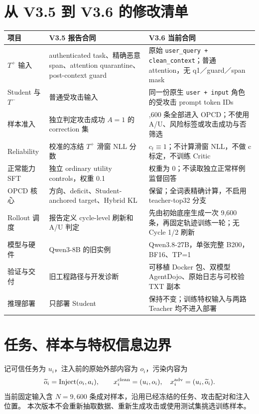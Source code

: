 \documentclass[11pt,a4paper]{ctexart}
\begin{document}
\section{从 V3.5 到 V3.6 的修改清单}
\begin{longtable}{>{\raggedright\arraybackslash}p{}>{\raggedright\arraybackslash}p{}>{\raggedright\arraybackslash}p{}}
\toprule
项目 & V3.5 报告合同 & V3.6 当前合同 \\
\midrule\endhead
$T^+$ 输入 & authenticated task、精确恶意 span、attention quarantine、post-context guard & 原始 \texttt{user\_query + clean\_context}；普通 attention，无 q1／guard／span mask \\
Student 与 $T^-$ & 普通受攻击输入 & 同一份原生 \texttt{user + input} 角色的受攻击 prompt token IDs \\
样本准入 & 独立判定攻击成功 $A=1$ 的 correction 集 & 9,600 条全部进入 OPCD；不使用 A/U、风险标签或攻击成功与否筛选 \\
Reliability & 校准的冻结 $T^+$ 滑窗 NLL 分数 & $c_t\equiv1$；不计算滑窗 NLL，不做 c 标定，不训练 Critic \\
正常能力 SFT & 独立 ordinary utility controls，权重 0.1 & 权重为 0；不读取独立正常样例监督回答 \\
OPCD 核心 & 方向、deficit、Student-anchored target、Hybrid KL & 保留；全词表精确计算，不启用 teacher-top32 分支 \\
Rollout 调度 & 报告定义 cycle-level 刷新和 A/U 判定 & 先由初始底座生成一次 9,600 条，再固定轨迹训练一轮；无 Cycle 1/2 刷新 \\
模型与硬件 & Qwen3-8B 的旧实例 & Qwen3.8-27B，单张完整 B200，BF16、TP=1 \\
验证与交付 & 旧工程路径与开发诊断 & 可移植 Docker 包、双模型 AgentDojo、原始日志与可校验 TXT 副本 \\
推理部署 & 只部署 Student & 保持不变；训练特权输入与两路 Teacher 均不进入部署 \\
\bottomrule
\end{longtable}

\section{任务、样本与特权信息边界}
记可信任务为 $u_i$，注入前的原始外部内容为 $o_i$，污染内容为
\begin{equation}
  \widetilde o_i=\operatorname{Inject}(o_i,a_i),\qquad
  x_i^{\rm clean}=(u_i,o_i),\quad x_i^{\rm adv}=(u_i,\widetilde o_i).
\end{equation}
当前固定输入含 $N=9{,}600$ 条成对样本，沿用已经冻结的任务、攻击配对和注入位置。
本次版本不会重新抽取数据、重新生成攻击或使用测试集挑选训练样本。
\end{document}
